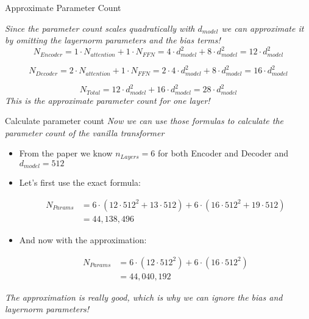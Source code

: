 \begin{frame}{Approximate Parameter Count}

\textit{Since the parameter count scales quadratically with $d_{model}$ we can approximate it by omitting the layernorm parameters and the bias terms!} 
$$N_{Encoder} = 1\cdot N_{attention} + 1\cdot N_{FFN} = 4\cdot d_{model}^2 + 8\cdot d_{model}^2 = 12 \cdot d_{model}^2$$

$$N_{Decoder} = 2\cdot N_{attention} + 1\cdot N_{FFN} = 2\cdot 4\cdot d_{model}^2 + 8\cdot d_{model}^2 = 16\cdot d_{model}^2$$

$$N_{Total} = 12\cdot d_{model}^2 + 16\cdot d_{model}^2 = 28\cdot d_{model}^2$$
\vfill
\textit{This is the approximate parameter count for one layer!}

\end{frame}


\begin{frame}{Calculate parameter count}
\textit{Now we can use those formulas to calculate the parameter count of the vanilla transformer}

\hspace{}

\begin{itemize}
    \item From the paper we know $n_{Layers} = 6$ for both Encoder and Decoder and $d_{model} = 512$
    \item Let's first use the exact formula:

$$
\begin{aligned}
N_{Params} &= 6\cdot(12\cdot 512^2 + 13\cdot 512) + 6\cdot(16\cdot 512^2 + 19\cdot 512) \\
&= 44,138,496
\end{aligned}
$$

\hspace{}

    \item And now with the approximation:

$$
\begin{aligned}
N_{Params} &= 6\cdot(12\cdot 512^2) + 6\cdot(16\cdot 512^2) \\
&= 44,040,192
\end{aligned}
$$

\end{itemize}

\vfill{}

\textit{The approximation is really good, which is why we can ignore the bias and layernorm parameters!}
    
\end{frame}

